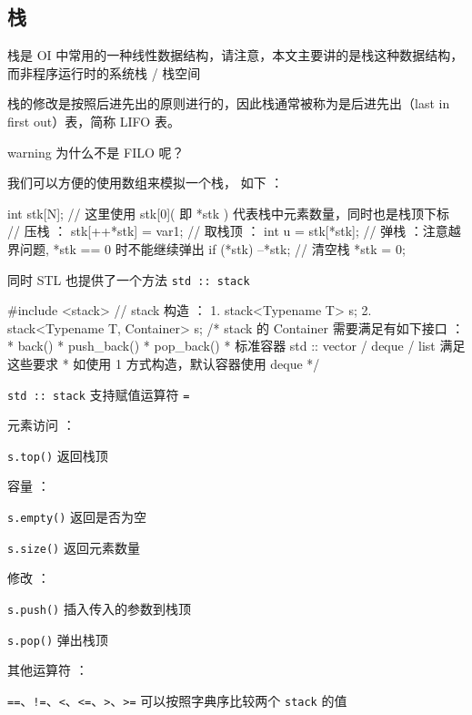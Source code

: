 
\subsection{栈}

栈是 OI 中常用的一种线性数据结构，请注意，本文主要讲的是栈这种数据结构， 而非程序运行时的系统栈 / 栈空间

栈的修改是按照后进先出的原则进行的，因此栈通常被称为是后进先出（last in first out）表，简称 LIFO 表。

\begin{NOTE}{warning}{}
为什么不是 FILO 呢？

\end{NOTE}


我们可以方便的使用数组来模拟一个栈， 如下 ：

\begin{cppcode}
int stk[N];
// 这里使用 stk[0]( 即 *stk ) 代表栈中元素数量，同时也是栈顶下标
// 压栈 ：
stk[++*stk] = var1;
// 取栈顶 ：
int u = stk[*stk];
// 弹栈 ：注意越界问题, *stk == 0 时不能继续弹出
if (*stk) --*stk;
// 清空栈
*stk = 0;
\end{cppcode}

同时 STL 也提供了一个方法 \texttt{std :: stack}

\begin{cppcode}
#include <stack>
// stack 构造 ：
1. stack<Typename T> s;
2. stack<Typename T, Container> s;
/* stack 的 Container 需要满足有如下接口 ：
 * back()
 * push_back()
 * pop_back()
 * 标准容器 std :: vector / deque / list 满足这些要求
 * 如使用 1 方式构造，默认容器使用 deque
 */
\end{cppcode}

\texttt{std :: stack} 支持赋值运算符 \texttt{=}

元素访问 ：

\texttt{s.top()} 返回栈顶

容量 ：

\texttt{s.empty()} 返回是否为空

\texttt{s.size()} 返回元素数量

修改 ：

\texttt{s.push()} 插入传入的参数到栈顶

\texttt{s.pop()} 弹出栈顶

其他运算符 ：

\texttt{==}、\texttt{!=}、\texttt{<}、\texttt{<=}、\texttt{>}、\texttt{>=} 可以按照字典序比较两个 \texttt{stack} 的值
